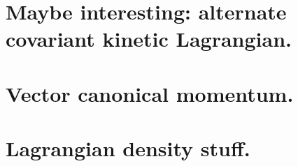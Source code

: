\chapter{Maybe interesting: alternate covariant kinetic Lagrangian.}
   
\chapter{Vector canonical momentum.}
\chapter{Lagrangian density stuff.}

\EndNoBibArticle
